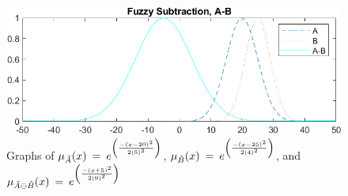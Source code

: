 \documentclass{article}
\begin{document}
\begin{figure}[h!]
    \centering
    \includegraphics[scale=1]{subtraction.png}
    \caption{\label{fig:sub_img} Graphs of $\mu_{\Tilde{A}}(x) \:=\:e^{\left( \frac{-(x-20)^2}{2(5)^{2}} \right)}$, $\mu_{\Tilde{B}}(x) \:=\:e^{\left( \frac{-(x-25)^2}{2(4)^{2}} \right)}$, and $\mu_{\Tilde{A}\ominus\Tilde{B}}(x) \:=\:e^{\left( \frac{-(x+5)^2}{2(9)^{2}}\right)}$}
    \label{fig:sub_img}
\end{figure}
\end{document}
